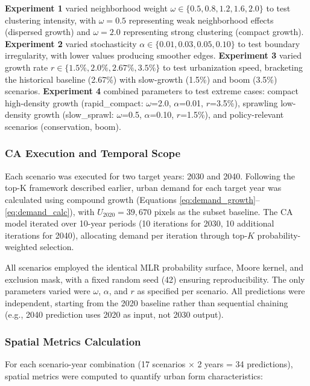 \documentclass[12pt,a4paper]{article}
\begin{document}
\textbf{Experiment 1} varied neighborhood weight $\omega \in \{0.5, 0.8, 1.2, 1.6, 2.0\}$ to test clustering intensity, with $\omega=0.5$ representing weak neighborhood effects (dispersed growth) and $\omega=2.0$ representing strong clustering (compact growth). \textbf{Experiment 2} varied stochasticity $\alpha \in \{0.01, 0.03, 0.05, 0.10\}$ to test boundary irregularity, with lower values producing smoother edges. \textbf{Experiment 3} varied growth rate $r \in \{1.5\%, 2.0\%, 2.67\%, 3.5\%\}$ to test urbanization speed, bracketing the historical baseline (2.67\%) with slow-growth (1.5\%) and boom (3.5\%) scenarios. \textbf{Experiment 4} combined parameters to test extreme cases: compact high-density growth (rapid\_compact: $\omega$=2.0, $\alpha$=0.01, $r$=3.5\%), sprawling low-density growth (slow\_sprawl: $\omega$=0.5, $\alpha$=0.10, $r$=1.5\%), and policy-relevant scenarios (conservation, boom).

\subsubsection{CA Execution and Temporal Scope}

Each scenario was executed for two target years: 2030 and 2040. Following the top-K framework described earlier, urban demand for each target year was calculated using compound growth (Equations \ref{eq:demand_growth}--\ref{eq:demand_calc}), with $U_{2020} = 39{,}670$ pixels as the subset baseline. The CA model iterated over 10-year periods (10 iterations for 2030, 10 additional iterations for 2040), allocating demand per iteration through top-$K$ probability-weighted selection.

All scenarios employed the identical MLR probability surface, Moore kernel, and exclusion mask, with a fixed random seed (42) ensuring reproducibility. The only parameters varied were $\omega$, $\alpha$, and $r$ as specified per scenario. All predictions were independent, starting from the 2020 baseline rather than sequential chaining (e.g., 2040 prediction uses 2020 as input, not 2030 output).

\subsubsection{Spatial Metrics Calculation}

For each scenario-year combination (17 scenarios $\times$ 2 years = 34 predictions), spatial metrics were computed to quantify urban form characteristics:
\end{document}
